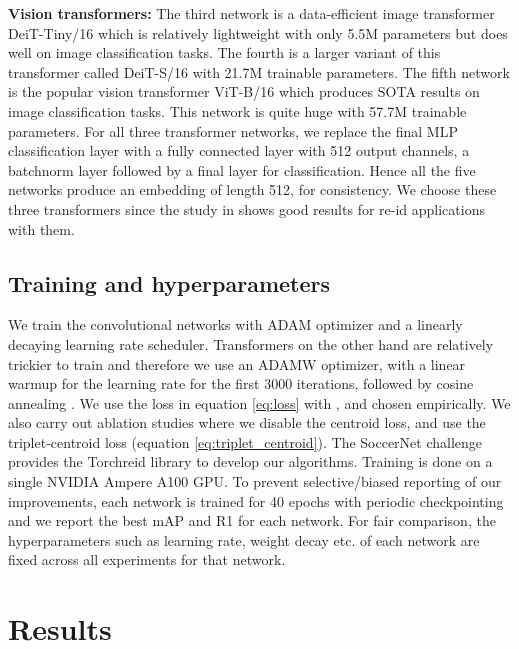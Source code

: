 \documentclass{article}
\begin{document}
\textbf{Vision transformers:} The third network is a data-efficient image transformer DeiT-Tiny/16 \cite{touvron2021training} which is relatively lightweight with only 5.5M parameters but does well on image classification tasks. The fourth is a larger variant of this transformer called DeiT-S/16 \cite{touvron2021training} with 21.7M trainable parameters. The fifth network is the popular vision transformer ViT-B/16 \cite{dosovitskiy2020image} which produces SOTA results on image classification tasks. This network is quite huge with 57.7M trainable parameters. For all three transformer networks, we replace the final MLP classification layer with a fully connected layer with 512 output channels, a batchnorm layer followed by a final layer for classification. Hence all the five networks produce an embedding of length 512, for consistency. We choose these three transformers since the study in \cite{he2021transreid} shows good results for re-id applications with them.

\subsection{Training and hyperparameters}

We train the convolutional networks with ADAM \cite{kingma2014adam} optimizer and a linearly decaying learning rate scheduler. Transformers on the other hand are relatively trickier to train and therefore we use an ADAMW \cite{adamw} optimizer, with a linear warmup for the learning rate for the first 3000 iterations, followed by cosine annealing \cite{loshchilov2016sgdr}. We use the loss in equation \ref{eq:loss} with ,  and  chosen empirically. We also carry out ablation studies where we disable the centroid loss, and use the triplet-centroid loss (equation \ref{eq:triplet_centroid}). The SoccerNet challenge provides the Torchreid \cite{zhou2019torchreid} library to develop our algorithms. Training is done on a single NVIDIA Ampere A100 GPU. To prevent selective/biased reporting of our improvements, each network is trained for 40 epochs with periodic checkpointing and we report the best mAP and R1 for each network. For fair comparison, the hyperparameters such as learning rate, weight decay etc. of each network are fixed across all experiments for that network.

\section{Results}
\label{sec:results}
\end{document}
